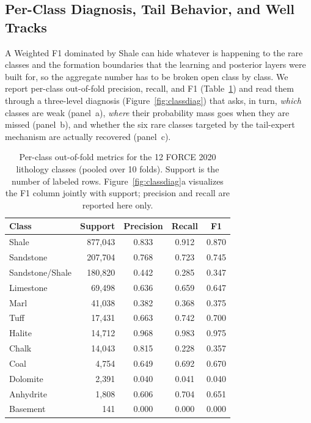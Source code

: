 \documentclass[bdcc,article,submit,pdftex,moreauthors]{Definitions/mdpi}
\begin{document}
\subsection{Per-Class Diagnosis, Tail Behavior, and Well Tracks}
\label{sec:rq4}
A Weighted F1 dominated by Shale can hide whatever is happening to the rare classes and the
formation boundaries that the learning and posterior layers were built for, so the aggregate
number has to be broken open class by class. We report per-class out-of-fold precision,
recall, and F1 (Table~\ref{tab:perclass}) and read them through a three-level diagnosis
(Figure~\ref{fig:classdiag}) that asks, in turn, \emph{which} classes are weak (panel~a),
\emph{where} their probability mass goes when they are missed (panel~b), and whether the six
rare classes targeted by the tail-expert mechanism are actually recovered (panel~c).

\begin{table}[H]
\caption{Per-class out-of-fold metrics for the 12 FORCE 2020 lithology classes (pooled over
10 folds). Support is the number of labeled rows. Figure~\ref{fig:classdiag}a visualizes the
F1 column jointly with support; precision and recall are reported here
only.\label{tab:perclass}}
\begin{tabularx}{\textwidth}{Xrccc}
\toprule
\textbf{Class} & \textbf{Support} & \textbf{Precision} & \textbf{Recall} & \textbf{F1}\\
\midrule
Shale & 877{,}043 & 0.833 & 0.912 & 0.870\\
Sandstone & 207{,}704 & 0.768 & 0.723 & 0.745\\
Sandstone/Shale & 180{,}820 & 0.442 & 0.285 & 0.347\\
Limestone & 69{,}498 & 0.636 & 0.659 & 0.647\\
Marl & 41{,}038 & 0.382 & 0.368 & 0.375\\
Tuff & 17{,}431 & 0.663 & 0.742 & 0.700\\
Halite & 14{,}712 & 0.968 & 0.983 & 0.975\\
Chalk & 14{,}043 & 0.815 & 0.228 & 0.357\\
Coal & 4{,}754 & 0.649 & 0.692 & 0.670\\
Dolomite & 2{,}391 & 0.040 & 0.041 & 0.040\\
Anhydrite & 1{,}808 & 0.606 & 0.704 & 0.651\\
Basement & 141 & 0.000 & 0.000 & 0.000\\
\bottomrule
\end{tabularx}
\end{table}
\end{document}
